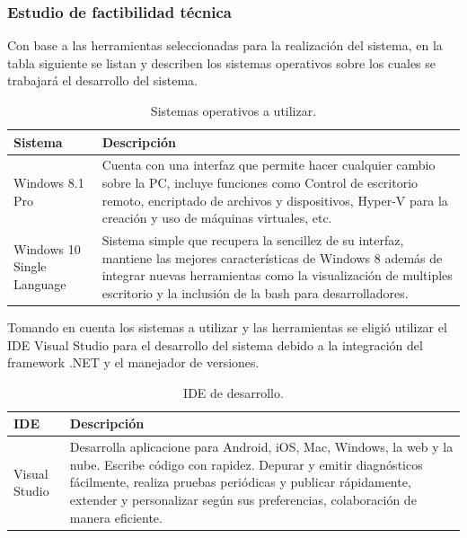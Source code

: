\documentclass[12pt]{report}
\begin{document}
\subsubsection{Estudio de factibilidad técnica}
Con base a las herramientas seleccionadas para la realización del sistema, en la tabla siguiente se listan y describen los sistemas operativos sobre los cuales se trabajará el desarrollo del sistema.
\begin{table}[H]
\begin{center}
\begin{tabular}{|p{40mm}|p{100mm}|}
\hline
Sistema & Descripción\\
\hline \hline 
Windows 8.1 Pro & Cuenta con una interfaz que permite hacer cualquier cambio sobre la PC, incluye funciones como Control de escritorio remoto, encriptado de archivos y dispositivos, Hyper-V para la creación y uso de máquinas virtuales, etc.\cite{win8}\\
\hline
Windows 10 Single Language & Sistema simple que recupera la sencillez de su interfaz, mantiene las mejores características de Windows 8 además de integrar nuevas herramientas como la visualización de multiples escritorio y la inclusión de la bash para desarrolladores.\cite{win10}\\
\hline
\end{tabular}
\caption{Sistemas operativos a utilizar.}
\end{center}
\end{table}

Tomando en cuenta los sistemas a utilizar y las herramientas se eligió utilizar el IDE Visual Studio para el desarrollo del sistema debido a la integración del framework .NET y el manejador de versiones.
\begin{table}[H]
\begin{center}
\begin{tabular}{|p{40mm}|p{100mm}|}
\hline
IDE & Descripción\\
\hline \hline 
Visual Studio & Desarrolla aplicacione para Android, iOS, Mac, Windows, la web y la nube. Escribe código con rapidez. Depurar y emitir diagnósticos fácilmente, realiza pruebas periódicas y publicar rápidamente, extender y personalizar según sus preferencias, colaboración de manera eficiente.\cite{visual}\\
\hline
\end{tabular}
\caption{IDE de desarrollo.}
\end{center}
\end{table}
\end{document}

